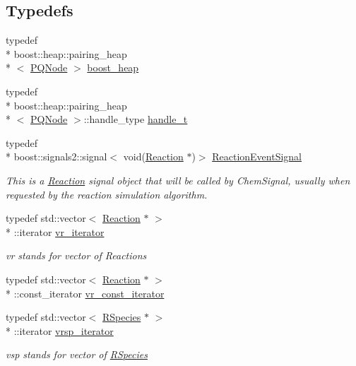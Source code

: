 \subsection*{Typedefs}
\begin{DoxyCompactItemize}
\item 
typedef \\*
boost\-::heap\-::pairing\-\_\-heap\\*
$<$ \hyperlink{classchem_1_1PQNode}{P\-Q\-Node} $>$ \hyperlink{namespacechem_aacd1d2bb93e0bb1b1af9bb1fbb5133ca}{boost\-\_\-heap}
\item 
typedef \\*
boost\-::heap\-::pairing\-\_\-heap\\*
$<$ \hyperlink{classchem_1_1PQNode}{P\-Q\-Node} $>$\-::handle\-\_\-type \hyperlink{namespacechem_a33be80d87771bff54f5cede2e5d81cd1}{handle\-\_\-t}
\item 
typedef \\*
boost\-::signals2\-::signal$<$ void(\hyperlink{classchem_1_1Reaction}{Reaction} $\ast$)$>$ \hyperlink{namespacechem_a85c409cf931d658d253b62ab5ad35781}{Reaction\-Event\-Signal}
\begin{DoxyCompactList}\small\item\em This is a \hyperlink{classchem_1_1Reaction}{Reaction} signal object that will be called by Chem\-Signal, usually when requested by the reaction simulation algorithm. \end{DoxyCompactList}\item 
typedef std\-::vector$<$ \hyperlink{classchem_1_1Reaction}{Reaction} $\ast$ $>$\\*
\-::iterator \hyperlink{namespacechem_a6c6fe26056b061cb8512c46063ad758e}{vr\-\_\-iterator}
\begin{DoxyCompactList}\small\item\em vr stands for vector of Reactions \end{DoxyCompactList}\item 
typedef std\-::vector$<$ \hyperlink{classchem_1_1Reaction}{Reaction} $\ast$ $>$\\*
\-::const\-\_\-iterator \hyperlink{namespacechem_a39d00f277b52572f1ab739d5354509f9}{vr\-\_\-const\-\_\-iterator}
\item 
typedef std\-::vector$<$ \hyperlink{classchem_1_1RSpecies}{R\-Species} $\ast$ $>$\\*
\-::iterator \hyperlink{namespacechem_a9b02b32d43473a3cd87fd30f910cc121}{vrsp\-\_\-iterator}
\begin{DoxyCompactList}\small\item\em vsp stands for vector of \hyperlink{classchem_1_1RSpecies}{R\-Species} \end{DoxyCompactList}\item 

\end{DoxyCompactItemize}
